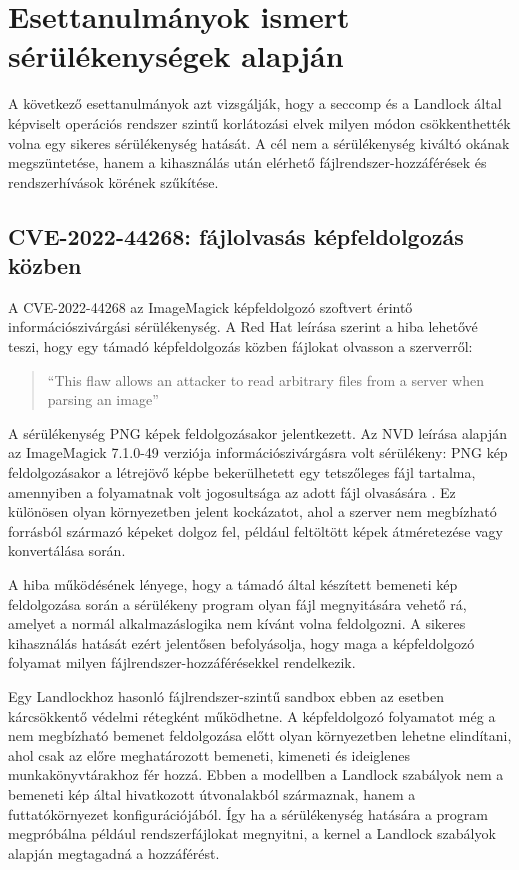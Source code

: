 \chapter{Esettanulmányok ismert sérülékenységek alapján}

A következő esettanulmányok azt vizsgálják, hogy
a seccomp és a Landlock által képviselt operációs rendszer szintű
korlátozási elvek milyen módon csökkenthették volna egy sikeres sérülékenység
hatását. A cél nem a sérülékenység kiváltó okának megszüntetése, hanem a
kihasználás után elérhető fájlrendszer-hozzáférések és rendszerhívások körének
szűkítése.

\section{CVE-2022-44268: fájlolvasás képfeldolgozás közben}

A CVE-2022-44268 az ImageMagick képfeldolgozó szoftvert érintő
információszivárgási sérülékenység. A Red Hat leírása szerint a hiba lehetővé
teszi, hogy egy támadó képfeldolgozás közben fájlokat olvasson a szerverről:
\begin{quote}
\foreignlanguage{english}{``This flaw allows an attacker to read arbitrary
files from a server when parsing an image''} \cite{redhat-cve-2022-44268}
\end{quote}

A sérülékenység PNG képek feldolgozásakor jelentkezett. Az NVD leírása alapján
az ImageMagick 7.1.0-49 verziója információszivárgásra volt sérülékeny: PNG kép
feldolgozásakor a létrejövő képbe bekerülhetett egy tetszőleges fájl tartalma,
amennyiben a  folyamatnak volt jogosultsága az adott fájl
olvasására \cite{nvd-cve-2022-44268}. Ez különösen olyan környezetben jelent
kockázatot, ahol a szerver nem megbízható forrásból származó képeket dolgoz fel,
például feltöltött képek átméretezése vagy konvertálása során.

A hiba működésének lényege, hogy a támadó által készített bemeneti kép
feldolgozása során a sérülékeny program olyan fájl megnyitására vehető rá,
amelyet a normál alkalmazáslogika nem kívánt volna feldolgozni. A sikeres
kihasználás hatását ezért jelentősen befolyásolja, hogy maga a képfeldolgozó
folyamat milyen fájlrendszer-hozzáférésekkel rendelkezik.

Egy Landlockhoz hasonló fájlrendszer-szintű sandbox ebben az esetben
kárcsökkentő védelmi rétegként működhetne. A képfeldolgozó folyamatot még a nem
megbízható bemenet feldolgozása előtt olyan környezetben lehetne elindítani,
ahol csak az előre meghatározott bemeneti, kimeneti és ideiglenes
munkakönyvtárakhoz fér hozzá. Ebben a modellben a Landlock szabályok nem a
bemeneti kép által hivatkozott útvonalakból származnak, hanem a
futtatókörnyezet konfigurációjából. Így ha a sérülékenység hatására a program
megpróbálna például rendszerfájlokat megnyitni, a kernel a Landlock szabályok
alapján megtagadná a hozzáférést.

